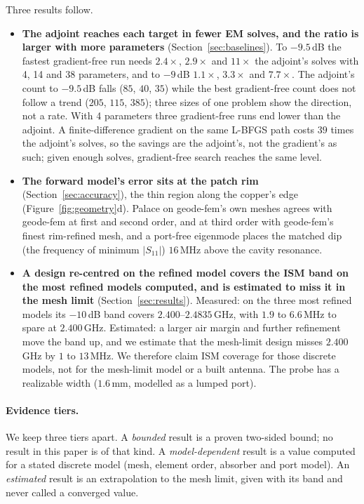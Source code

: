 \documentclass{anvil-paper}
\begin{document}
Three results follow.
\begin{itemize}
  \item \textbf{The adjoint reaches each target in fewer EM solves, and the
  ratio is larger with more parameters} (Section~\ref{sec:baselines}). To
  $-9.5$\,dB the fastest gradient-free run needs $2.4\times$, $2.9\times$ and
  $11\times$ the adjoint's solves with 4, 14 and 38 parameters, and to
  $-9$\,dB $1.1\times$, $3.3\times$ and $7.7\times$. The adjoint's count to
  $-9.5$\,dB falls ($85$, $40$, $35$) while the best gradient-free count does
  not follow a trend ($205$, $115$, $385$); three sizes of one problem show
  the direction, not a rate. With 4 parameters three gradient-free runs end
  lower than the adjoint. A finite-difference gradient on the same L-BFGS path
  costs $39$ times the adjoint's solves, so the savings are the adjoint's, not
  the gradient's as such; given enough solves, gradient-free search reaches
  the same level.
  \item \textbf{The forward model's error sits at the patch rim}
  (Section~\ref{sec:accuracy}), the thin region along the copper's edge
  (Figure~\ref{fig:geometry}d). Palace on geode-fem's own meshes agrees with
  geode-fem at first and second order, and at third order with geode-fem's
  finest rim-refined mesh, and a port-free eigenmode places the matched dip
  (the frequency of minimum $|S_{11}|$) $16$\,MHz above the cavity resonance.
  \item \textbf{A design re-centred on the refined model covers the ISM band
  on the most refined models computed, and is estimated to miss it in the
  mesh limit} (Section~\ref{sec:results}). Measured: on the three most refined
  models its $-10$\,dB band covers $2.400$--$2.4835$\,GHz, with $1.9$ to
  $6.6$\,MHz to spare at $2.400$\,GHz. Estimated: a larger air margin and
  further refinement move the band up, and we estimate that the mesh-limit
  design misses $2.400$\,GHz by $1$ to $13$\,MHz. We therefore claim ISM
  coverage for those discrete models, not for the mesh-limit model or a built
  antenna. The probe has a realizable width ($1.6$\,mm, modelled as a lumped
  port).
\end{itemize}

\paragraph{Evidence tiers.}
We keep three tiers apart. A \emph{bounded} result is a proven two-sided
bound; no result in this paper is of that kind. A \emph{model-dependent}
result is a value computed for a stated discrete model (mesh, element order,
absorber and port model). An \emph{estimated} result is an extrapolation to
the mesh limit, given with its band and never called a converged value.
\end{document}
